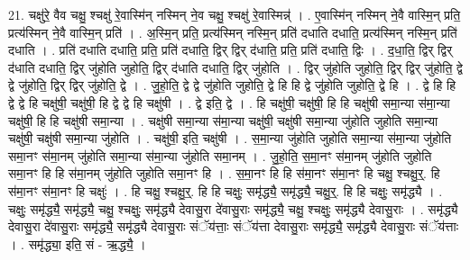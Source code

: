 \documentclass[17pt]{extarticle}
\begin{document}
21. चक्षु॑रे॒ वैव चक्षु॒ श्चक्षु॑ रे॒वास्मि॑न् नस्मिन् ने॒व चक्षु॒ श्चक्षु॑ रे॒वास्मिन्न्॑ । . ए॒वास्मि॑न् नस्मिन् ने॒वै वास्मि॒न् प्रति॒ प्रत्य॑स्मिन् ने॒वै वास्मि॒न् प्रति॑ । . अ॒स्मि॒न् प्रति॒ प्रत्य॑स्मिन् नस्मि॒न् प्रति॑ दधाति दधाति॒ प्रत्य॑स्मिन् नस्मि॒न् प्रति॑ दधाति । . प्रति॑ दधाति दधाति॒ प्रति॒ प्रति॑ दधाति॒ द्विर् द्विर् द॑धाति॒ प्रति॒ प्रति॑ दधाति॒ द्विः । . द॒धा॒ति॒ द्विर् द्विर् द॑धाति दधाति॒ द्विर् जु॑होति जुहोति॒ द्विर् द॑धाति दधाति॒ द्विर् जु॑होति । . द्विर् जु॑होति जुहोति॒ द्विर् द्विर् जु॑होति॒ द्वे द्वे जु॑होति॒ द्विर् द्विर् जु॑होति॒ द्वे । . जु॒हो॒ति॒ द्वे द्वे जु॑होति जुहोति॒ द्वे हि हि द्वे जु॑होति जुहोति॒ द्वे हि । . द्वे हि हि द्वे द्वे हि चक्षु॑षी॒ चक्षु॑षी॒ हि द्वे द्वे हि चक्षु॑षी । . द्वे इति॒ द्वे । . हि चक्षु॑षी॒ चक्षु॑षी॒ हि हि चक्षु॑षी समा॒न्या स॑मा॒न्या चक्षु॑षी॒ हि हि चक्षु॑षी समा॒न्या । . चक्षु॑षी समा॒न्या स॑मा॒न्या चक्षु॑षी॒ चक्षु॑षी समा॒न्या जु॑होति जुहोति समा॒न्या चक्षु॑षी॒ चक्षु॑षी समा॒न्या जु॑होति । . चक्षु॑षी॒ इति॒ चक्षु॑षी । . स॒मा॒न्या जु॑होति जुहोति समा॒न्या स॑मा॒न्या जु॑होति समा॒नꣳ स॑मा॒नम् जु॑होति समा॒न्या स॑मा॒न्या जु॑होति समा॒नम् । . जु॒हो॒ति॒ स॒मा॒नꣳ स॑मा॒नम् जु॑होति जुहोति समा॒नꣳ हि हि स॑मा॒नम् जु॑होति जुहोति समा॒नꣳ हि । . स॒मा॒नꣳ हि हि स॑मा॒नꣳ स॑मा॒नꣳ हि चक्षु॒ श्चक्षु॒र्॒. हि स॑मा॒नꣳ स॑मा॒नꣳ हि चक्षुः॑ । . हि चक्षु॒ श्चक्षु॒र्॒. हि हि चक्षुः॒ समृ॑द्ध्यै॒ समृ॑द्ध्यै॒ चक्षु॒र्॒. हि हि चक्षुः॒ समृ॑द्ध्यै । . चक्षुः॒ समृ॑द्ध्यै॒ समृ॑द्ध्यै॒ चक्षु॒ श्चक्षुः॒ समृ॑द्ध्यै देवासु॒रा दे॑वासु॒राः समृ॑द्ध्यै॒ चक्षु॒ श्चक्षुः॒ समृ॑द्ध्यै देवासु॒राः । . समृ॑द्ध्यै देवासु॒रा दे॑वासु॒राः समृ॑द्ध्यै॒ समृ॑द्ध्यै देवासु॒राः संॅय॑त्ताः॒ संॅय॑त्ता देवासु॒राः समृ॑द्ध्यै॒ समृ॑द्ध्यै देवासु॒राः संॅय॑त्ताः । . समृ॑द्ध्या॒ इति॒ सं - ऋ॒द्ध्यै॒ । \newline
\end{document}
